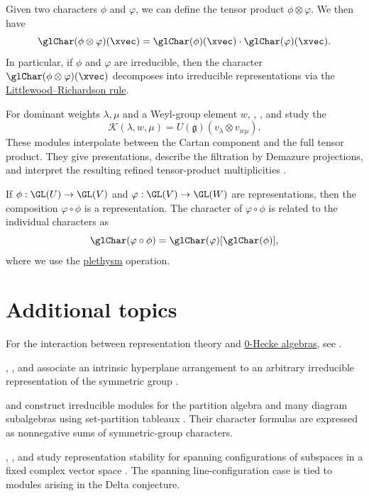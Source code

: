 Given two characters $\phi$ and $\varphi$, we can define the tensor product
$\phi \otimes \varphi$.  We then have
\[
\glChar(\phi \otimes \varphi)(\xvec) = \glChar(\phi)(\xvec) \cdot \glChar(\varphi)(\xvec).
\]
In particular, if $\phi$ and $\varphi$ are irreducible, then
the character $\glChar(\phi \otimes \varphi)(\xvec)$ decomposes into irreducible
representations via the \hyperref[schurLittlewoodRichardson]{Littlewood--Richardson rule}.

For dominant weights $\lambda,\mu$ and a Weyl-group element $w$,
, , and
 study the 
\label{kostantKumarModule}
\[
 \mathcal K(\lambda,w,\mu)
 =U(\mathfrak g)(v_\lambda\otimes v_{w\mu}).
\]
These modules interpolate between the Cartan component and the full tensor
product.  They give presentations, describe the filtration by Demazure
projections, and interpret the resulting refined tensor-product
multiplicities \cite{GuptaRaghavanViswanath2026x}.


If $\phi : \GL(U) \to \GL(V)$ and $\varphi : \GL(V) \to \GL(W)$ are representations,
then the composition $\varphi \circ \phi$ is a representation.
The character of $\varphi \circ \phi$ is related to the individual characters as
\[
\glChar(\varphi \circ \phi) = \glChar(\varphi)[ \glChar(\phi) ],
\]
where we use the \hyperref[plethysm]{plethysm} operation.


\section[repTheoryMore]{Additional topics}

For the interaction between representation theory and
\hyperref[zeroHeckeAlgebra]{0-Hecke algebras}, see
\cite{HicksMillerBrown2024x}.

, , and 
associate an intrinsic hyperplane arrangement to an arbitrary irreducible
representation of the symmetric group \cite{TsilevichVershikYuzvinsky2020}.

 and  construct irreducible
modules for the partition algebra and many diagram subalgebras using
set-partition tableaux \cite{HalversonJacobson2020}.  Their character
formulas are expressed as nonnegative sums of symmetric-group characters.

, , and 
study representation stability for spanning configurations of subspaces in a
fixed complex vector space \cite{PawlowskiRamosRhoades2023}.  The spanning
line-configuration case is tied to modules arising in the Delta conjecture.

